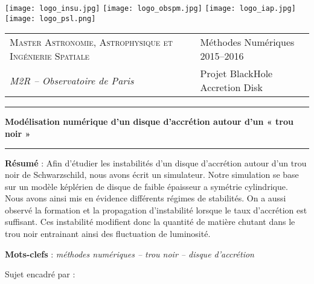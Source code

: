 \thispagestyle{empty}

\texttt{[image: logo\_insu.jpg]} \hfill
\texttt{[image: logo\_obspm.jpg]} \hfill
\texttt{[image: logo\_iap.jpg]} \hfill
\texttt{[image: logo\_psl.png]}
 
\vspace{0.5cm}

\begin{tabularx}{\textwidth}{@{} l X l @{}}
\textsc{Master Astronomie, Astrophysique et Ingénierie Spatiale} & & Méthodes Numériques 2015–2016 \\
\textit{M2R – Observatoire de Paris} & & Projet BlackHole Accretion Disk
\end{tabularx}
 
\begin{center}
 
\vspace{1.5cm}
 
\rule[11pt]{5cm}{0.5pt}
 
\textbf{\huge Modélisation numérique d’un disque d’accrétion autour d’un « trou noir »}

\rule{5cm}{0.5pt}

\vspace{1.5cm}


\parbox{15cm}{\textbf{Résumé} : Afin d'étudier les instabilités d'un disque d'accrétion autour d'un trou noir de Schwarzschild, nous avons écrit un simulateur. Notre simulation se base sur un modèle képlérien de disque de faible épaisseur a symétrie cylindrique. Nous avons ainsi mis en évidence différents régimes de stabilités. On a aussi observé la formation et la propagation d'instabilité lorsque le taux d'accrétion est suffisant. Ces instabilité modifient donc la quantité de matière chutant dans le trou noir entrainant ainsi  des fluctuation de luminosité.
} %

\vspace{0.5cm}

\parbox{15cm}{
\textbf{Mots-clefs} : \it méthodes numériques – trou noir – disque d’accrétion
} %

\vspace{0.5cm}

\parbox{15cm}{
Sujet encadré par :

}
\end{center}
